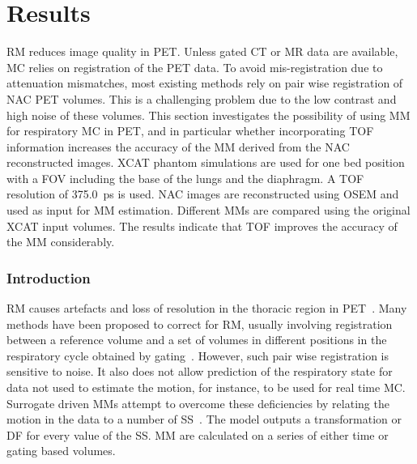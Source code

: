 \chapter{Results} \label{sec:results}
    
    
        \gls{RM} reduces image quality in \gls{PET}. Unless gated \gls{CT} or \gls{MR} data are available, \gls{MC} relies on registration of the \gls{PET} data. To avoid mis-registration due to attenuation mismatches, most existing methods rely on pair wise registration of \gls{NAC} \gls{PET} volumes. This is a challenging problem due to the low contrast and high noise of these volumes. This section investigates the possibility of using \gls{MM} for respiratory \gls{MC} in \gls{PET}, and in particular whether incorporating \gls{TOF} information increases the accuracy of the \gls{MM} derived from the \gls{NAC} reconstructed images. \gls{XCAT} phantom simulations are used for one bed position with a \gls{FOV} including the base of the lungs and the diaphragm. A \gls{TOF} resolution of \SI{375.0}{\pico\second} is used. \gls{NAC} images are reconstructed using \gls{OSEM} and used as input for \gls{MM} estimation. Different \gls{MM}s are compared using the original \gls{XCAT} input volumes. The results indicate that \gls{TOF} improves the accuracy of the \gls{MM} considerably.
        
        \subsection{Introduction} \label{sec:impact_of_tof_on_respiratory_motion_modelling_using_nac_pet_introduction}
        \gls{RM} causes artefacts and loss of resolution in the thoracic region in \gls{PET}~. Many methods have been proposed to correct for \gls{RM}, usually involving registration between a reference volume and a set of volumes in different positions in the respiratory cycle obtained by gating~. However, such pair wise registration is sensitive to noise. It also does not allow prediction of the respiratory state for data not used to estimate the motion, for instance, to be used for real time \gls{MC}. Surrogate driven \gls{MM}s attempt to overcome these deficiencies by relating the motion in the data to a number of \gls{SS}~. The model outputs a transformation or \gls{DF} for every value of the \gls{SS}. \gls{MM} are calculated on a series of either time or gating based volumes.

